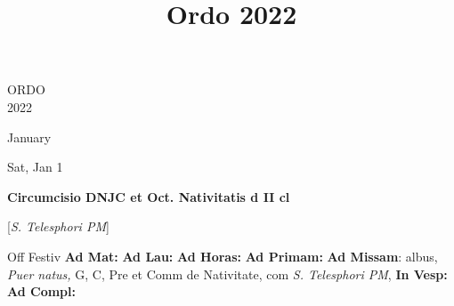 \documentclass[10pt]{memoir}
\title{Ordo 2022}
\begin{document}
    \pagestyle{fancy}
    
    \thispagestyle{empty}
    \begin{center}
        \begin{minipage}[c][3in][c]{3.5in}
            \begin{center}
                {\HUGE \lsstyle ORDO}\\
                \vspace{0.2in}
                {\lsstyle \LARGE 2022}
            \end{center}
        \end{minipage}
    \end{center}
    \clearpage
    \pagebreak
    

\begin{center}
\pagebreak
\thispagestyle{empty}
{\Huge January}
\end{center}
                    
\begin{center}
\begin{minipage}{3.5in}
\vspace{2em}
\begin{center}Sat, Jan 1
\end{center}
\textbf{ \large Circumcisio DNJC et Oct. Nativitatis
\textnormal{\normalsize d II cl}}

[\textit{S. Telesphori PM}]

\begin{justify}Off Festiv
\textbf{Ad Mat: }
\textbf{Ad Lau: }
\textbf{Ad Horas: }
\textbf{Ad Primam: }\textbf{Ad Missam}: albus, \textit{Puer natus,} G, C, Pre et Comm de Nativitate, com \textit{S. Telesphori PM}, 
\textbf{In Vesp: }
\textbf{Ad Compl: }
\end{justify}
\end{minipage}
\end{center}
\end{document}

